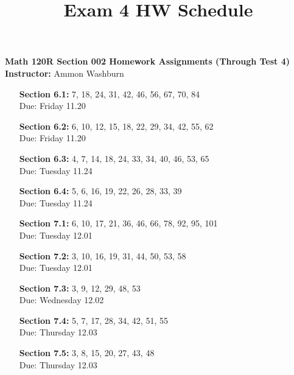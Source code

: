 \documentclass[fleqn]{article}
\title{Exam 4 HW Schedule}
\begin{document}
{\centering
{\bf Math 120R Section 002 Homework Assignments (Through Test 4)} \\[10px]
{\bf Instructor: } Ammon Washburn \\[20px]
}

\begin{enumerate}
\item[\bf Section 6.1:] 7, 18, 24, 31, 42, 46, 56, 67, 70, 84 \\
{\color{blue} Due: Friday 11.20}

\item[\bf Section 6.2:] 6, 10, 12, 15, 18, 22, 29, 34, 42, 55, 62 \\
{\color{blue} Due: Friday 11.20}

\item[\bf Section 6.3:] 4, 7, 14, 18, 24, 33, 34, 40, 46, 53, 65 \\
{\color{blue} Due: Tuesday 11.24}

\item[\bf Section 6.4:] 5, 6, 16, 19, 22, 26, 28, 33, 39 \\
{\color{blue} Due: Tuesday 11.24}

\item[\bf Section 7.1:] 6, 10, 17, 21, 36, 46, 66, 78, 92, 95, 101 \\
{\color{blue} Due: Tuesday 12.01}

\item[\bf Section 7.2:] 3, 10, 16, 19, 31, 44, 50, 53, 58 \\
{\color{blue} Due: Tuesday 12.01}

\item[\bf Section 7.3:] 3, 9, 12, 29, 48, 53 \\
{\color{blue} Due: Wednesday 12.02}

\item[\bf Section 7.4:] 5, 7, 17, 28, 34, 42, 51, 55 \\
{\color{blue} Due: Thursday 12.03}

\item[\bf Section 7.5:] 3, 8, 15, 20, 27, 43, 48 \\
{\color{blue} Due: Thursday 12.03}

\end{enumerate}
\end{document}
